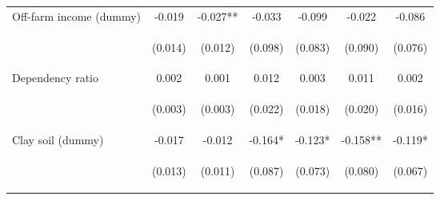 \begin{center}
\begin{tabular}{lcccccc}
Off-farm income (dummy) & -0.019 & -0.027** & -0.033 & -0.099 & -0.022 & -0.086 \\
\vspace{4pt} & \begin{footnotesize}(0.014)\end{footnotesize} & \begin{footnotesize}(0.012)\end{footnotesize} & \begin{footnotesize}(0.098)\end{footnotesize} & \begin{footnotesize}(0.083)\end{footnotesize} & \begin{footnotesize}(0.090)\end{footnotesize} & \begin{footnotesize}(0.076)\end{footnotesize} \\
Dependency ratio & 0.002 & 0.001 & 0.012 & 0.003 & 0.011 & 0.002 \\
\vspace{4pt} & \begin{footnotesize}(0.003)\end{footnotesize} & \begin{footnotesize}(0.003)\end{footnotesize} & \begin{footnotesize}(0.022)\end{footnotesize} & \begin{footnotesize}(0.018)\end{footnotesize} & \begin{footnotesize}(0.020)\end{footnotesize} & \begin{footnotesize}(0.016)\end{footnotesize} \\
Clay soil (dummy) & -0.017 & -0.012 & -0.164* & -0.123* & -0.158** & -0.119* \\
\vspace{4pt} & \begin{footnotesize}(0.013)\end{footnotesize} & \begin{footnotesize}(0.011)\end{footnotesize} & \begin{footnotesize}(0.087)\end{footnotesize} & \begin{footnotesize}(0.073)\end{footnotesize} & \begin{footnotesize}(0.080)\end{footnotesize} & \begin{footnotesize}(0.067)\end{footnotesize} \\

\end{tabular}
\end{center}
